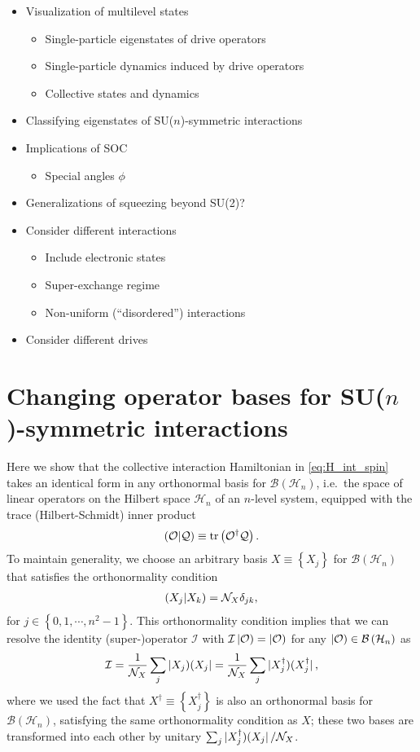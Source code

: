 \documentclass[nofootinbib,notitlepage,11pt]{revtex4-2}
\newcommand{\f}[2]{\dfrac{#1}{#2}} %
\newcommand{\p}[1]{\left(#1\right)} %
\renewcommand{\set}[1]{\left\{#1\right\}} %
\newcommand{\1}{\mathds{1}}
\newcommand{\B}{\mathcal{B}}
\renewcommand{\H}{\mathcal{H}}
\newcommand{\I}{\mathcal{I}}
\newcommand{\N}{\mathcal{N}}
\renewcommand{\O}{\mathcal{O}}
\newcommand{\Q}{\mathcal{Q}}
\def\obra#1{\mathinner{({#1}|}}
\def\oket#1{\mathinner{|{#1})}}
\def\obk#1{\mathinner{({#1})}}
\def\oop#1#2{\oket{#1}\!\obra{#2}}
\begin{document}
\begin{itemize}
\item Visualization of multilevel states
  \begin{itemize}
  \item Single-particle eigenstates of drive operators
  \item Single-particle dynamics induced by drive operators
  \item Collective states and dynamics
  \end{itemize}
\item Classifying eigenstates of SU($n$)-symmetric interactions
\item Implications of SOC
  \begin{itemize}
  \item Special angles $\phi$
  \end{itemize}
\item Generalizations of squeezing beyond SU(2)?
\item Consider different interactions
  \begin{itemize}
  \item Include electronic states
  \item Super-exchange regime
  \item Non-uniform (``disordered'') interactions
  \end{itemize}
\item Consider different drives
\end{itemize}

\appendix

\section{Changing operator bases for SU($n$)-symmetric interactions}
\label{sec:changing_bases}

Here we show that the collective interaction Hamiltonian in
\eqref{eq:H_int_spin} takes an identical form in any orthonormal basis
for $\B\p{\H_n}$, i.e.~the space of linear operators on the Hilbert
space $\H_n$ of an $n$-level system, equipped with the trace
(Hilbert-Schmidt) inner product
\begin{align}
  \obk{\O|\Q} \equiv \tr\p{\O^\dag \Q}.
\end{align}
To maintain generality, we choose an arbitrary basis
$X\equiv\set{X_j}$ for $\B\p{\H_n}$ that satisfies the orthonormality
condition
\begin{align}
  \obk{X_j|X_k} = \N_X \delta_{jk},
\end{align}
for $j\in\set{0,1,\cdots,n^2-1}$.  This orthonormality condition
implies that we can resolve the identity (super-)operator $\I$ with
$\I\oket{\O}=\oket{\O}$ for any $\oket\O\in\B\p{\H_n}$ as
\begin{align}
  \I = \f1{\N_X} \sum_j \oop{X_j}{X_j}
  = \f1{\N_X} \sum_j \oop{X_j^\dag}{X_j^\dag},
\end{align}
where we used the fact that $X^\dag\equiv\set{X_j^\dag}$ is also an
orthonormal basis for $\B\p{\H_n}$, satisfying the same orthonormality
condition as $X$; these two bases are transformed into each other by
unitary $\sum_j\oop{X_j^\dag}{X_j}/\N_X$.
\end{document}
